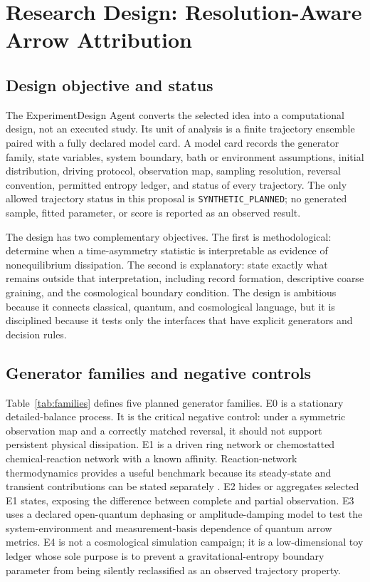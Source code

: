 \section{Research Design: Resolution-Aware Arrow Attribution}

\subsection{Design objective and status}

The ExperimentDesign Agent converts the selected idea into a computational design, not an executed study. Its unit of analysis is a finite trajectory ensemble paired with a fully declared model card. A model card records the generator family, state variables, system boundary, bath or environment assumptions, initial distribution, driving protocol, observation map, sampling resolution, reversal convention, permitted entropy ledger, and status of every trajectory. The only allowed trajectory status in this proposal is \texttt{SYNTHETIC\_PLANNED}; no generated sample, fitted parameter, or score is reported as an observed result.

The design has two complementary objectives. The first is methodological: determine when a time-asymmetry statistic is interpretable as evidence of nonequilibrium dissipation. The second is explanatory: state exactly what remains outside that interpretation, including record formation, descriptive coarse graining, and the cosmological boundary condition. The design is ambitious because it connects classical, quantum, and cosmological language, but it is disciplined because it tests only the interfaces that have explicit generators and decision rules.

\subsection{Generator families and negative controls}

Table~\ref{tab:families} defines five planned generator families. E0 is a stationary detailed-balance process. It is the critical negative control: under a symmetric observation map and a correctly matched reversal, it should not support persistent physical dissipation. E1 is a driven ring network or chemostatted chemical-reaction network with a known affinity. Reaction-network thermodynamics provides a useful benchmark because its steady-state and transient contributions can be stated separately \cite{rao_esposito2016}. E2 hides or aggregates selected E1 states, exposing the difference between complete and partial observation. E3 uses a declared open-quantum dephasing or amplitude-damping model to test the system-environment and measurement-basis dependence of quantum arrow metrics. E4 is not a cosmological simulation campaign; it is a low-dimensional toy ledger whose sole purpose is to prevent a gravitational-entropy boundary parameter from being silently reclassified as an observed trajectory property.


